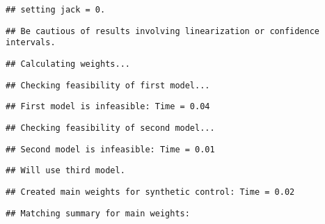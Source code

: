 \documentclass[
]{article}
\begin{document}
\begin{verbatim}
## setting jack = 0.
\end{verbatim}

\begin{verbatim}
## Be cautious of results involving linearization or confidence intervals.
\end{verbatim}

\begin{verbatim}
## Calculating weights...
\end{verbatim}

\begin{verbatim}
## Checking feasibility of first model...
\end{verbatim}

\begin{verbatim}
## First model is infeasible: Time = 0.04
\end{verbatim}

\begin{verbatim}
## Checking feasibility of second model...
\end{verbatim}

\begin{verbatim}
## Second model is infeasible: Time = 0.01
\end{verbatim}

\begin{verbatim}
## Will use third model.
\end{verbatim}

\begin{verbatim}
## Created main weights for synthetic control: Time = 0.02
\end{verbatim}

\begin{verbatim}
## Matching summary for main weights:
\end{verbatim}
\end{document}
